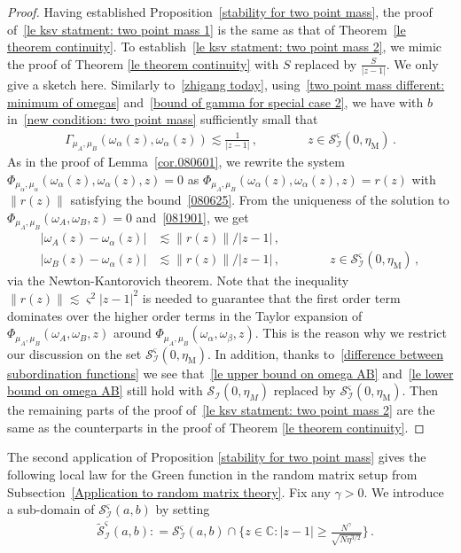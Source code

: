 \documentclass[10pt,reqno]{amsart}
\numberwithin{equation}{section}
\theoremstyle{plain}
\numberwithin{kevin}{section}
\theoremstyle{remark}
\newcommand{\deq}{\mathrel{\mathop:}=}
\newcommand{\PP}{\Phi}
\begin{document}
\begin{proof} Having established Proposition~\ref{stability for two point mass}, the proof of~\eqref{le ksv statment: two point mass 1} is the same as that of Theorem~\ref{le theorem continuity}. To establish~\eqref{le ksv statment: two point mass 2}, we mimic the proof of Theorem \ref{le theorem continuity} with $S$ replaced by $\frac{S}{|z-1|}$. We only give a sketch here. Similarly to~\eqref{zhigang today}, using~\eqref{two point mass different: minimum of omegas} and~\eqref{bound of gamma for special case 2}, we have with $b$ in~\eqref{new condition: two point mass} sufficiently small that
\begin{align}\label{081901}
\Gamma_{\mu_A,\mu_B}(\omega_\alpha(z),\omega_\alpha(z))\lesssim \frac{1}{|z-1|}\,,\qquad\qquad z\in\mathcal{S}_{\mathcal{I}}^\varsigma(0,\eta_{\mathrm{M}})\,.
\end{align}
As in the proof of Lemma~\ref{cor.080601}, we rewrite the system $\PP_{\mu_\alpha,\mu_\alpha}(\omega_\alpha(z),\omega_\alpha(z), z)=0$ as $\PP_{\mu_A,\mu_B}(\omega_\alpha(z),\omega_\alpha(z), z)=r(z)$ with $\|r(z)\|$
satisfying the bound~\eqref{080625}. From the uniqueness of the solution to $\PP_{\mu_A,\mu_B}(\omega_A,\omega_B, z)=0$ and~\eqref{081901}, we get
\begin{align}\label{difference between subordination functions}
|\omega_A(z)-\omega_\alpha(z)|&\lesssim \|r(z)\|/|z-1|\,,\nonumber\\
|\omega_B(z)-\omega_\alpha(z)|&\lesssim \|r(z)\|/|z-1|\,,\qquad\qquad z\in \mathcal{S}_{\mathcal{I}}^\varsigma(0,\eta_{\mathrm{M}}) \,,
\end{align}
via the Newton-Kantorovich theorem. Note that the inequality $\|r(z)\|\lesssim \varsigma^2 |z-1|^2$ is needed to guarantee that the first order term dominates over the higher order terms in the Taylor expansion of $\PP_{\mu_A,\mu_B}(\omega_A,\omega_B, z)$ around $\PP_{\mu_A,\mu_B}(\omega_\alpha,\omega_\beta, z)$. This is the reason why we restrict our discussion on the set $\mathcal{S}_{\mathcal{I}}^\varsigma(0,\eta_{\mathrm{M}})$. In addition, thanks to~\eqref{difference between subordination functions} we see that~\eqref{le upper bound on omega AB} and~\eqref{le lower bound on omega AB} still hold with $\mathcal{S}_{\mathcal{I}}(0,\eta_M)$ replaced by $\mathcal{S}_{\mathcal{I}}^\varsigma(0,\eta_{\mathrm{M}})$. Then the remaining parts of the proof of~\eqref{le ksv statment: two point mass 2} are  
the same as the counterparts in the proof of Theorem \ref{le theorem continuity}.
\end{proof}
The second application of Proposition \ref{stability for two point mass} gives the following local law for the Green function in the random matrix setup from Subsection~\ref{Application to random matrix theory}. Fix any $\gamma>0$. We introduce a sub-domain of $\mathcal{S}_{\mathcal{I}}^{\varsigma}(a,b)$ by setting
\begin{align}
 &\widetilde{\mathcal{S}}_{\mathcal{I}}^{\varsigma}(a,b)\deq \mathcal{S}_{\mathcal{I}}^{\varsigma}(a,b)\cap \Big\{z\in \mathbb{C}: |z-1|\geq \frac{N^{\gamma}}{\sqrt{N\eta^{3/2}}}\Big\}\,.
\end{align}
\end{document}
